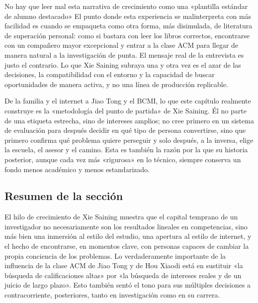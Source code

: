 \begin{warningbox}{No hay que leer mal esta narrativa de crecimiento como una «plantilla estándar de alumno destacado»}
El punto donde esta experiencia se malinterpreta con más facilidad es cuando se empaqueta como otra forma, más disimulada, de literatura de superación personal: como si bastara con leer los libros correctos, encontrarse con un compañero mayor excepcional y entrar a la clase ACM para llegar de manera natural a la investigación de punta. El mensaje real de la entrevista es justo el contrario. Lo que Xie Saining subraya una y otra vez es el azar de las decisiones, la compatibilidad con el entorno y la capacidad de buscar oportunidades de manera activa, y no una línea de producción replicable.
\end{warningbox}

De la familia y el internet a Jiao Tong y el BCMI, lo que este capítulo realmente construye es la «metodología del punto de partida» de Xie Saining. Él no parte de una etiqueta estrecha, sino de intereses amplios; no cree primero en un sistema de evaluación para después decidir en qué tipo de persona convertirse, sino que primero confirma qué problema quiere perseguir y solo después, a la inversa, elige la escuela, el asesor y el camino. Esta es también la razón por la que su historia posterior, aunque cada vez más «rigurosa» en lo técnico, siempre conserva un fondo menos académico y menos estandarizado.

\subsection{Resumen de la sección}

El hilo de crecimiento de Xie Saining muestra que el capital temprano de un investigador no necesariamente son los resultados lineales en competencias, sino más bien una inmersión al estilo del estudio, una apertura al estilo de internet, y el hecho de encontrarse, en momentos clave, con personas capaces de cambiar la propia conciencia de los problemas. Lo verdaderamente importante de la influencia de la clase ACM de Jiao Tong y de Hou Xiaodi está en sustituir «la búsqueda de calificaciones altas» por «la búsqueda de intereses reales y de un juicio de largo plazo». Esto también sentó el tono para sus múltiples decisiones a contracorriente, posteriores, tanto en investigación como en su carrera.

